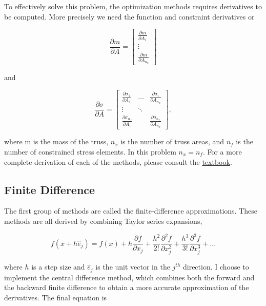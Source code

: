 \documentclass{article}
\begin{document}
To effectively solve this problem, the optimization methods requires derivatives to be computed. More precisely we need the function  and constraint derivatives or 


\begin{equation}
\frac{\partial m}{\partial A}=
\begin{bmatrix} 
\frac{\partial m}{\partial A_1} \\
\vdots \\
\frac{\partial m}{\partial A_{n_x}}
\end{bmatrix}
\end{equation}

and 

\begin{equation}
\frac{\partial \sigma}{\partial A}=
\begin{bmatrix} 
\frac{\partial \sigma_1}{\partial A_1} & \dots & \frac{\partial \sigma_i}{\partial A_{n_x}} \\
\vdots & \ddots & \\
\frac{\partial \sigma_{n_f}}{\partial A_1} &        & \frac{\partial \sigma_{n_f}}{\partial A_{n_x}} 
\end{bmatrix},
\end{equation}

where m is the mass of the truss, $n_x$ is the number of truss areas, and $n_f$ is the number of constrained stress elements. In this problem $n_x=n_f$. For a more complete derivation of each of the methods, please consult the \href{https://byu.box.com/shared/static/17bqmaop0v1o0fwqg1etx7dofl6ad35t.pdf}{textbook}.

\subsection*{Finite Difference}

The first group of methods are called the finite-difference approximations. These methods are all derived by combining Taylor series expansions,

$$ f(x+h\hat{e}_j)=f(x)+h\frac{\partial f}{\partial x_j} + \frac{h^2}{2!}\frac{\partial^2f}{\partial x_j^2}+\frac{h^3}{3!}\frac{\partial^3f}{\partial x_j^3
} + \dots $$

where $h$ is a step size and $\hat{e}_j$ is the unit vector in the $j^{th}$ direction. I choose to implement the central difference method, which combines both the forward and the backward finite difference to obtain a more accurate approximation of the derivatives. The final equation is 
\end{document}
